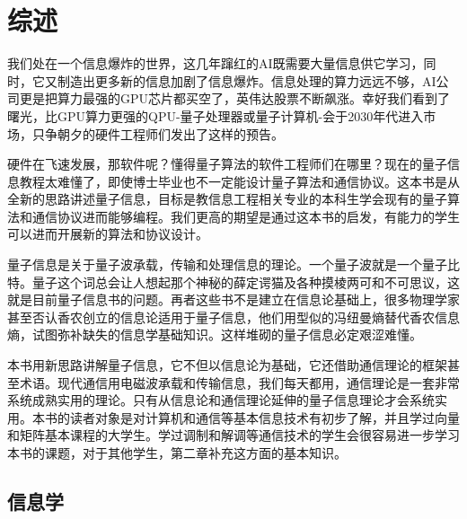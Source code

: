 \documentclass{ctexbook}
\begin{document}




\setcounter{tocdepth}{3}
\tableofcontents

\mainmatter

\chapter{综述}\label{c-intro}
我们处在一个信息爆炸的世界，这几年蹿红的AI既需要大量信息供它学习，同时，它又制造出更多新的信息加剧了信息爆炸。信息处理的算力远远不够，AI公司更是把算力最强的GPU芯片都买空了，英伟达股票不断飙涨。幸好我们看到了曙光，比GPU算力更强的QPU-量子处理器或量子计算机-会于2030年代进入市场，只争朝夕的硬件工程师们发出了这样的预告。

硬件在飞速发展，那软件呢？懂得量子算法的软件工程师们在哪里？现在的量子信息教程太难懂了，即使博士毕业也不一定能设计量子算法和通信协议。这本书是从全新的思路讲述量子信息，目标是教信息工程相关专业的本科生学会现有的量子算法和通信协议进而能够编程。我们更高的期望是通过这本书的启发，有能力的学生可以进而开展新的算法和协议设计。

量子信息是关于量子波承载，传输和处理信息的理论。一个量子波就是一个量子比特。量子这个词总会让人想起那个神秘的薛定谔猫及各种摸棱两可和不可思议，这就是目前量子信息书的问题。再者这些书不是建立在信息论基础上，很多物理学家甚至否认香农创立的信息论适用于量子信息，他们用型似的冯纽曼熵替代香农信息熵，试图弥补缺失的信息学基础知识。这样堆砌的量子信息必定艰涩难懂。

本书用新思路讲解量子信息，它不但以信息论为基础，它还借助通信理论的框架甚至术语。现代通信用电磁波承载和传输信息，我们每天都用，通信理论是一套非常系统成熟实用的理论。只有从信息论和通信理论延伸的量子信息理论才会系统实用。本书的读者对象是对计算机和通信等基本信息技术有初步了解，并且学过向量和矩阵基本课程的大学生。学过调制和解调等通信技术的学生会很容易进一步学习本书的课题，对于其他学生，第二章补充这方面的基本知识。

\section{信息学}
\end{document}
